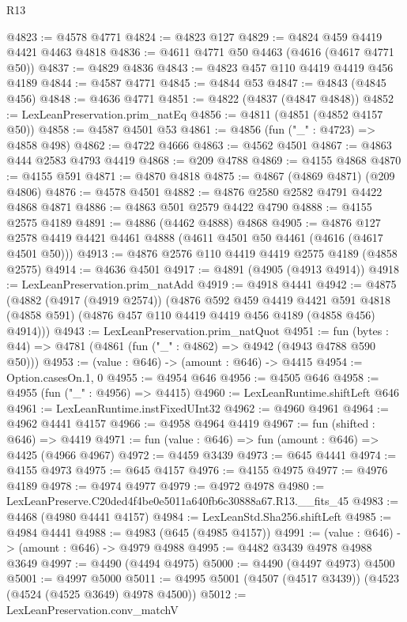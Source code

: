 \begin{lexlean}{R13}
\begin{coremodule}
@4823 := @4578 @4771
@4824 := @4823 @127
@4829 := @4824 @459 @4419 @4421 @4463 @4818
@4836 := @4611 @4771 @50 @4463 (@4616 (@4617 @4771 @50))
@4837 := @4829 @4836
@4843 := @4823 @457 @110 @4419 @4419 @456 @4189
@4844 := @4587 @4771
@4845 := @4844 @53
@4847 := @4843 (@4845 @456)
@4848 := @4636 @4771
@4851 := @4822 (@4837 (@4847 @4848))
@4852 := LexLeanPreservation.prim_natEq
@4856 := @4811 (@4851 (@4852 @4157 @50))
@4858 := @4587 @4501 @53
@4861 := @4856 (fun ("_" : @4723) => @4858 @498)
@4862 := @4722 @4666
@4863 := @4562 @4501
@4867 := @4863 @444 @2583 @4793 @4419
@4868 := @209 @4788
@4869 := @4155 @4868
@4870 := @4155 @591
@4871 := @4870 @4818
@4875 := @4867 (@4869 @4871) (@209 @4806)
@4876 := @4578 @4501
@4882 := @4876 @2580 @2582 @4791 @4422 @4868 @4871
@4886 := @4863 @501 @2579 @4422 @4790
@4888 := @4155 @2575 @4189
@4891 := @4886 (@4462 @4888) @4868
@4905 := @4876 @127 @2578 @4419 @4421 @4461 @4888 (@4611 @4501 @50 @4461 (@4616 (@4617 @4501 @50)))
@4913 := @4876 @2576 @110 @4419 @4419 @2575 @4189 (@4858 @2575)
@4914 := @4636 @4501
@4917 := @4891 (@4905 (@4913 @4914))
@4918 := LexLeanPreservation.prim_natAdd
@4919 := @4918 @4441
@4942 := @4875
    (@4882
      (@4917 (@4919 @2574))
      (@4876
        @592
        @459
        @4419
        @4421
        @591
        @4818
        (@4858 @591)
        (@4876 @457 @110 @4419 @4419 @456 @4189 (@4858 @456) @4914)))
@4943 := LexLeanPreservation.prim_natQuot
@4951 := fun (bytes : @44) => @4781 (@4861 (fun ("_" : @4862) => @4942 (@4943 @4788 @590 @50)))
@4953 := (value : @646) -> (amount : @646) -> @4415
@4954 := Option.casesOn.{1, 0}
@4955 := @4954 @646
@4956 := @4505 @646
@4958 := @4955 (fun ("_" : @4956) => @4415)
@4960 := LexLeanRuntime.shiftLeft @646
@4961 := LexLeanRuntime.instFixedUInt32
@4962 := @4960 @4961
@4964 := @4962 @4441 @4157
@4966 := @4958 @4964 @4419
@4967 := fun (shifted : @646) => @4419
@4971 := fun (value : @646) => fun (amount : @646) => @4425 (@4966 @4967)
@4972 := @4459 @3439
@4973 := @645 @4441
@4974 := @4155 @4973
@4975 := @645 @4157
@4976 := @4155 @4975
@4977 := @4976 @4189
@4978 := @4974 @4977
@4979 := @4972 @4978
@4980 := LexLeanPreserve.C20ded4f4be0e5011a640fb6c30888a67.R13.__fits_45
@4983 := @4468 (@4980 @4441 @4157)
@4984 := LexLeanStd.Sha256.shiftLeft
@4985 := @4984 @4441
@4988 := @4983 (@645 (@4985 @4157))
@4991 := (value : @646) -> (amount : @646) -> @4979 @4988
@4995 := @4482 @3439 @4978 @4988 @3649
@4997 := @4490 (@4494 @4975)
@5000 := @4490 (@4497 @4973) @4500
@5001 := @4997 @5000
@5011 := @4995 @5001 (@4507 (@4517 @3439)) (@4523 (@4524 (@4525 @3649) @4978 @4500))
@5012 := LexLeanPreservation.conv_matchV

\end{coremodule}
\end{lexlean}
